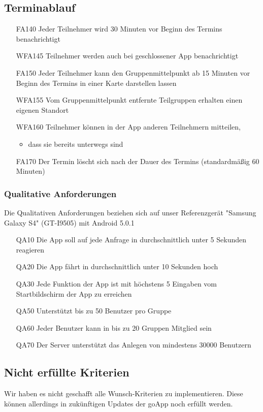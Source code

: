 \documentclass{scrartcl}
\begin{document}
	\subsection{Terminablauf}
	\begin{itemize}
		\item[FA140] Jeder Teilnehmer wird 30 Minuten vor Beginn des Termins benachrichtigt
		\item[WFA145] Teilnehmer werden auch bei geschlossener App benachrichtigt
		\item[FA150] Jeder Teilnehmer kann den Gruppenmittelpunkt ab 15 Minuten vor Beginn des Termins in einer Karte darstellen lassen
		\item[WFA155] Vom Gruppenmittelpunkt entfernte Teilgruppen  erhalten einen eigenen Standort 
	\item[WFA160] Teilnehmer können in der App anderen Teilnehmern mitteilen,
	\begin{itemize}
				\item dass sie bereits unterwegs sind
	\end{itemize}
		\item[FA170] Der Termin löscht sich nach der Dauer des Termins (standardmäßig 60 Minuten)
	\end{itemize}
		
		
	\subsubsection{Qualitative Anforderungen}
	Die Qualitativen Anforderungen beziehen sich auf unser Referenzgerät
	"Samsung Galaxy S4" (GT-I9505) mit Android 5.0.1
	\begin{itemize}
		\item[QA10] Die App soll auf jede Anfrage in durchschnittlich unter 5 Sekunden reagieren
		\item[QA20] Die App fährt in durchschnittlich unter 10 Sekunden hoch
		\item[QA30] Jede Funktion der App ist mit höchstens 5 Eingaben vom Startbildschirm der App zu erreichen
		\item[QA50] Unterstützt bis zu 50 Benutzer pro Gruppe
		\item[QA60] Jeder Benutzer kann in bis zu 20 Gruppen Mitglied sein
		\item[QA70] Der Server unterstützt das Anlegen von mindestens 30000 Benutzern
	\end{itemize}
	
	\newpage
	\subsection{Nicht erfüllte Kriterien}
	Wir haben es nicht geschafft alle Wunsch-Kriterien zu implementieren. Diese können allerdings in zukünftigen Updates der goApp noch erfüllt werden.
\end{document}
